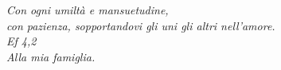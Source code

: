 \begin{titlepage}                       %
\thispagestyle{empty}                   %
\topmargin=6.5cm                        %
\raggedleft                             %
\large                                  %
\em
Con ogni umilt\`a e mansuetudine,\\ con pazienza, sopportandovi gli uni gli altri nell'amore.\\
\textit{Ef 4,2}\\                                   %
Alla mia famiglia.                      
\newpage                                %
\clearpage{\pagestyle{empty}\cleardoublepage}
\end{titlepage}